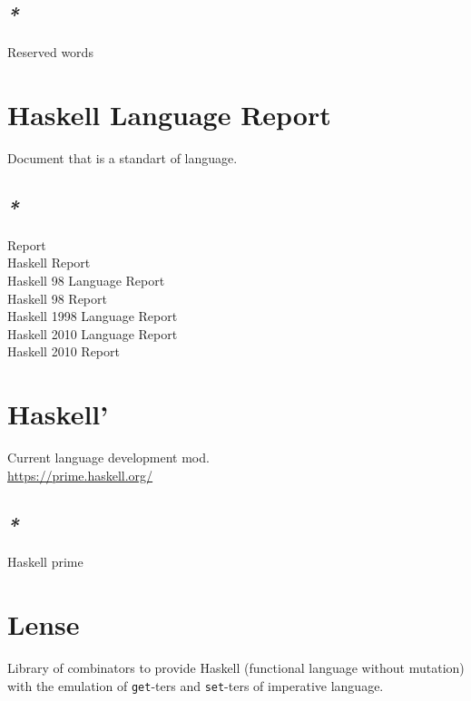 \documentclass[a4paper,14pt,oneside]{book}
\begin{document}
\subsection{\emph{*}}
\label{sec:orgca54305}
\label{org1a53bf4}Reserved words\\

\section{\label{orgb3df81c}Haskell Language Report}
\label{sec:orgfa2a1b7}
Document that is a standart of language.\\

\subsection{\emph{*}}
\label{sec:org489ec40}
\label{org3662383}Report\\
\label{org0c89b03}Haskell Report\\
\label{org8472d31}Haskell 98 Language Report\\
\label{org8de9ee9}Haskell 98 Report\\
\label{org187ecb6}Haskell 1998 Language Report\\
\label{orgc119c02}Haskell 2010 Language Report\\
\label{orgbea2ac6}Haskell 2010 Report\\

\section{\label{orgecc1506}Haskell'}
\label{sec:org3708d32}
Current language development mod.\\

\url{https://prime.haskell.org/}\\

\subsection{\emph{*}}
\label{sec:org216c788}

\label{org68a2915}Haskell prime\\

\section{\label{org267b7dc}Lense}
\label{sec:org4299217}
Library of combinators to provide Haskell (functional language without mutation) with the emulation of \texttt{get}-ters and \texttt{set}-ters of imperative language.\\
\end{document}
